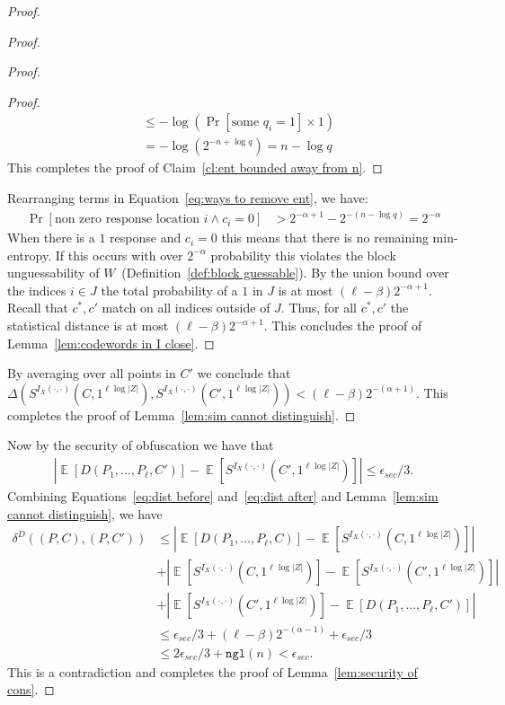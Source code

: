 \documentclass[11pt]{article}
\newcommand{\defref}[1]{\mbox{Definition~\ref{#1}}}
\newcommand{\lemref}[1]{\mbox{Lemma~\ref{#1}}}
\newcommand{\clref}[1]{\mbox{Claim~\ref{#1}}}
\DeclareMathOperator*{\expe}{\mathbb{E}}
\newcommand{\ngl}{\ensuremath{\mathtt{ngl}}\xspace}
\begin{document}
\begin{proof}
\begin{proof}
\begin{proof}
\begin{proof}
\begin{align*}
&\leq  -\log \left(\Pr[\text{some }q_i=1]\times 1\right)\\
&=-\log\left( 2^{-n+\log q} \right) = n-\log q
\end{align*}
This completes the proof of \clref{cl:ent bounded away from n}.
\end{proof}
\noindent
Rearranging terms in Equation~\ref{eq:ways to remove ent}, we have:
\begin{align*}
 \Pr[\text{non zero response location }i \wedge c_i=0] &>2^{-\alpha+1} - 2^{-(n-\log q)}=  2^{-\alpha}
 \end{align*}
 When there is a $1$ response and $c_i=0$ this means that there is no remaining min-entropy.  If this occurs with over $2^{-\alpha}$ probability this violates the block unguessability of $W$~(\defref{def:block guessable}).  By the union bound over the indices $i\in J$ the total probability of a $1$ in $J$ is at most $(\ell-\beta)2^{-\alpha+1}$. Recall that $c^*, c'$ match on all indices outside of $J$. Thus, for all $c^*, c'$ the statistical distance is at most $(\ell- \beta)2^{-\alpha+1}$.  This concludes the proof of \lemref{lem:codewords in I close}.
\end{proof}
By averaging over all points in $C'$ we conclude that $\Delta(S^{I_X(\cdot, \cdot)}(C, 1^{\ell \log |Z|}), S^{I_X(\cdot, \cdot)}(C', 1^{\ell \log |Z|})) < (\ell -\beta)2^{-(\alpha+1)}$.  This completes the proof of \lemref{lem:sim cannot distinguish}.
\end{proof}

\noindent Now by the security of obfuscation we have that
\begin{align}
\label{eq:dist after}
|\expe [D(P_1,..., P_\ell, C') ]- \expe [S^{I_X(\cdot, \cdot)}(C', 1^{\ell \log |Z|})] |\leq \epsilon_{sec}/3.
\end{align}
Combining Equations~\ref{eq:dist before} and~\ref{eq:dist after} and \lemref{lem:sim cannot distinguish}, we have
\begin{align*}
\delta^{D}(( P, C), (P, C'))&\leq |\expe [D(P_1,..., P_\ell, C)] - \expe [S^{I_X(\cdot, \cdot)}(C, 1^{\ell \log |Z|})]| \\
&+|\expe[S^{I_X(\cdot, \cdot)}(C, 1^{\ell \log |Z|})] - \expe[S^{I_X(\cdot, \cdot)}(C', 1^{\ell \log |Z|})] |\\
&+|\expe [S^{I_X(\cdot, \cdot)}(C', 1^{\ell \log |Z|})] - \expe [D(P_1,..., P_\ell, C') ]|\\
&\leq \epsilon_{sec}/3+ (\ell-\beta)2^{-(\alpha-1)}+\epsilon_{sec}/3 \\
&\leq 2\epsilon_{sec}/3 + \ngl(n) < \epsilon_{sec}.
\end{align*}
This is a contradiction and completes the proof of \lemref{lem:security of cons}.
\end{proof}
\end{document}
